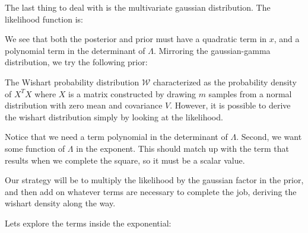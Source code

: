 \documentclass[12pt]{article}
\begin{document}
The last thing to deal with is the multivariate gaussian distribution. The likelihood function is:


We see that both the posterior and prior must have a quadratic term in $x$, and a polynomial term in the determinant of $\Lambda$. Mirroring the gaussian-gamma distribution, we try the following prior:


The Wishart probability distribution $\mathcal{W}$ characterized as the probability density of $X^TX$ where $X$ is a matrix constructed by drawing $m$ samples from a normal distribution with zero mean and covariance $V$. However, it is possible to derive the wishart distribution simply by looking at the likelihood.

Notice that we need a term polynomial in the determinant of $\Lambda$. Second, we want some function of $\Lambda$ in the exponent. This should match up with the term that results when we complete the square, so it must be a scalar value.

Our strategy will be to multiply the likelihood by the gaussian factor in the prior, and then add on whatever terms are necessary to complete the job, deriving the wishart density along the way.


Lets explore the terms inside the exponential:

\end{document}
